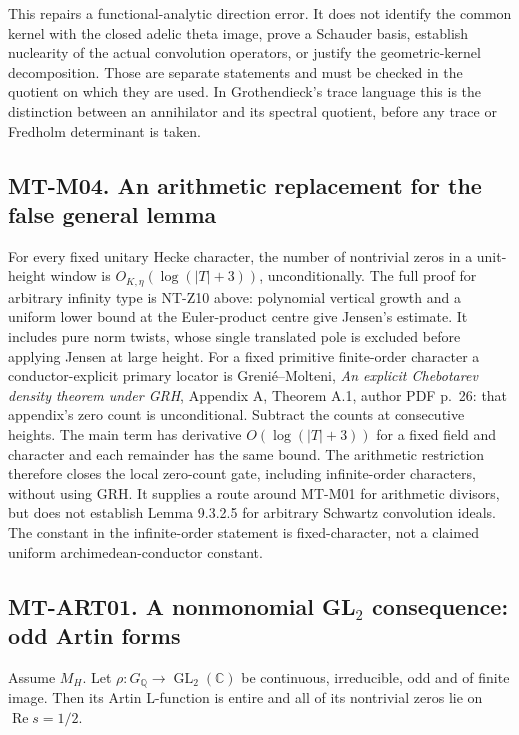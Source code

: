 This repairs a functional-analytic direction error.  It does not identify
the common kernel with the closed adelic theta image, prove a Schauder
basis, establish nuclearity of the actual convolution operators, or justify
the geometric-kernel decomposition.  Those are separate statements and
must be checked in the quotient on which they are used.  In Grothendieck's
trace language this is the distinction between an annihilator and its
spectral quotient, before any trace or Fredholm determinant is taken.

\subsection*{MT-M04. An arithmetic replacement for the false general lemma}
For every fixed unitary Hecke character, the number of nontrivial zeros
in a unit-height window is $O_{K,\eta}(\log(|T|+3))$, unconditionally.
The full proof for arbitrary infinity type is NT-Z10 above: polynomial
vertical growth and a uniform lower bound at the Euler-product centre
give Jensen's estimate.  It includes pure norm twists, whose single
translated pole is excluded before applying Jensen at large height.
For a fixed primitive finite-order character a conductor-explicit
primary locator is Greni\'e--Molteni,
\emph{An explicit Chebotarev density theorem under GRH}, Appendix A,
Theorem A.1, author PDF p.~26: that appendix's zero count is unconditional.
Subtract the counts at consecutive heights.  The main term has derivative
$O(\log(|T|+3))$ for a fixed field and character and each remainder has the
same bound.  The arithmetic restriction therefore closes the local
zero-count gate, including infinite-order characters, without using GRH.
It supplies a route around MT-M01 for arithmetic divisors, but does not
establish Lemma 9.3.2.5 for arbitrary Schwartz convolution ideals.  The
constant in the infinite-order statement is fixed-character, not a
claimed uniform archimedean-conductor constant.

\subsection*{MT-ART01. A nonmonomial GL\texorpdfstring{$_2$}{2} consequence: odd Artin forms}
Assume $M_H$.  Let $\rho:G_{\mathbb Q}\to\operatorname{GL}_2(\mathbb C)$
be continuous, irreducible, odd and of finite image.  Then its Artin
L-function is entire and all of its nontrivial zeros lie on
$\operatorname{Re}s=1/2$.

